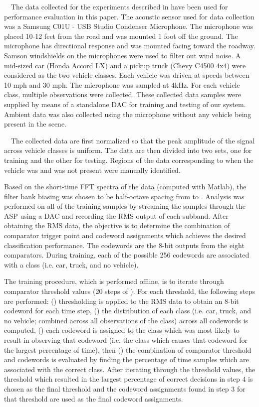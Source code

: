 ~~The data collected for the experiments described in \cite{lanl} have been used for performance evaluation in this paper. The acoustic sensor used for data collection was a Samsung C01U - USB Studio Condenser Microphone. The microphone was placed 10-12 feet from the road and was mounted 1 foot off the ground.  The microphone has directional response and was mounted facing toward the roadway. Samson windshields on the microphones were used to filter out wind noise. A mid-sized car (Honda Accord LX) and a pickup truck (Chevy C4500 4x4) were considered as the two vehicle classes. Each vehicle was driven at speeds between 10 mph and 30 mph. The microphone was sampled at 4kHz. For each vehicle class, multiple observations were collected. These collected data samples were supplied by means of a standalone DAC for training and testing of our system. Ambient data was also collected using the microphone without any vehicle being present in the scene. 



~~The collected data are first normalized so that the peak amplitude of the signal across vehicle classes is uniform.  The data are then divided into two sets, one for training and the other for testing. Regions of the data corresponding to when the vehicle was and was not present were manually identified. 

Based on the short-time FFT spectra of the data (computed with Matlab), the filter bank biasing was chosen to be half-octave spacing from  to .  Analysis was performed on all of the training samples by streaming the samples through the ASP using a DAC and recording the RMS output of each subband.  After obtaining the RMS data, the objective is to determine the combination of comparator trigger point and codeword assignments which achieves the desired classification performance.  The codewords are the 8-bit outputs from the eight comparators.  During training, each of the possible 256 codewords are associated with a class (i.e. car, truck, and no vehicle).  

The training procedure, which is performed offline, is to iterate through comparator threshold values (20 steps of ).  For each threshold, the following steps are performed: () thresholding is applied to the RMS data to obtain an 8-bit codeword for each time step, () the distribution of each class (i.e. car, truck, and no vehicle; combined across all observations of the class) across all codewords is computed, () each codeword is assigned to the class which was most likely to result in observing that codeword (i.e. the class which causes that codeword for the largest percentage of time), then () the combination of comparator threshold and codewords is evaluated by finding the percentage of time samples which are associated with the correct class.  After iterating through the threshold values, the threshold which resulted in the largest percentage of correct decisions in step 4 is chosen as the final threshold and the codeword assignments found in step 3 for that threshold are used as the final codeword assignments.

